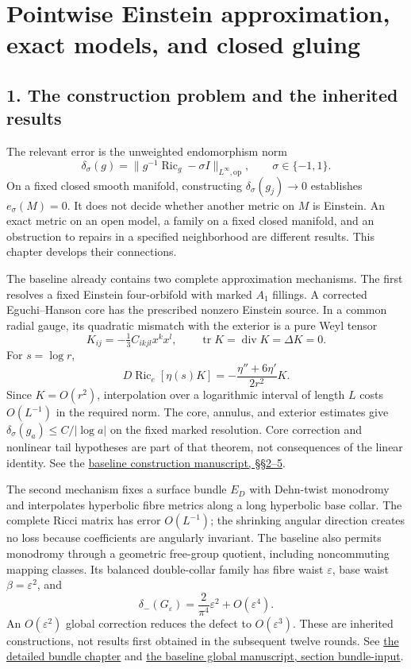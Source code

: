 \documentclass[
  english,
]{article}
\author{}
\date{}
\begin{document}
\hypertarget{pointwise-einstein-approximation-exact-models-and-closed-gluing}{%
\section{Pointwise Einstein approximation, exact models, and closed
gluing}\label{pointwise-einstein-approximation-exact-models-and-closed-gluing}}

\hypertarget{the-construction-problem-and-the-inherited-results}{%
\subsection{1. The construction problem and the inherited
results}\label{the-construction-problem-and-the-inherited-results}}

The relevant error is the unweighted endomorphism norm \[
\delta_\sigma(g)=\|g^{-1}\operatorname{Ric}_g-\sigma I\|_{L^\infty,\mathrm{op}},
\qquad \sigma\in\{-1,1\}.
\] On a fixed closed smooth manifold, constructing
\(\delta_\sigma(g_j)\to0\) establishes \(e_\sigma(M)=0\). It does not
decide whether another metric on \(M\) is Einstein. An exact metric on
an open model, a family on a fixed closed manifold, and an obstruction
to repairs in a specified neighborhood are different results. This
chapter develops their connections.

The baseline already contains two complete approximation mechanisms. The
first resolves a fixed Einstein four-orbifold with marked \(A_1\)
fillings. A corrected Eguchi--Hanson core has the prescribed nonzero
Einstein source. In a common radial gauge, its quadratic mismatch with
the exterior is a pure Weyl tensor \[
K_{ij}=-\tfrac13 C_{ikjl}x^kx^l,\qquad
\operatorname{tr}K=\operatorname{div}K=\Delta K=0.
\] For \(s=\log r\), \[
D\operatorname{Ric}_e[\eta(s)K]
 =-\frac{\eta''+6\eta'}{2r^2}K.
\] Since \(K=O(r^2)\), interpolation over a logarithmic interval of
length \(L\) costs \(O(L^{-1})\) in the required norm. The core,
annulus, and exterior estimates give
\(\delta_\sigma(g_a)\le C/|\log a|\) on the fixed marked resolution.
Core correction and nonlinear tail hypotheses are part of that theorem,
not consequences of the linear identity. See the
\href{../baseline/research/20260916_construction.tex}{baseline
construction manuscript, §§2--5}.

The second mechanism fixes a surface bundle \(E_D\) with Dehn-twist
monodromy and interpolates hyperbolic fibre metrics along a long
hyperbolic base collar. The complete Ricci matrix has error
\(O(L^{-1})\); the shrinking angular direction creates no loss because
coefficients are angularly invariant. The baseline also permits
monodromy through a geometric free-group quotient, including
noncommuting mapping classes. Its balanced double-collar family has
fibre waist \(\varepsilon\), base waist \(\beta=\varepsilon^2\), and \[
\delta_-(G_\varepsilon)=\frac{2}{\pi^4}\varepsilon^2+O(\varepsilon^4).
\] An \(O(\varepsilon^2)\) global correction reduces the defect to
\(O(\varepsilon^3)\). These are inherited constructions, not results
first obtained in the subsequent twelve rounds. See
\href{../baseline/research/20260912.tex}{the detailed bundle chapter}
and \href{../baseline/research/20260916_global.tex}{the baseline global
manuscript, section bundle-input}.
\end{document}
